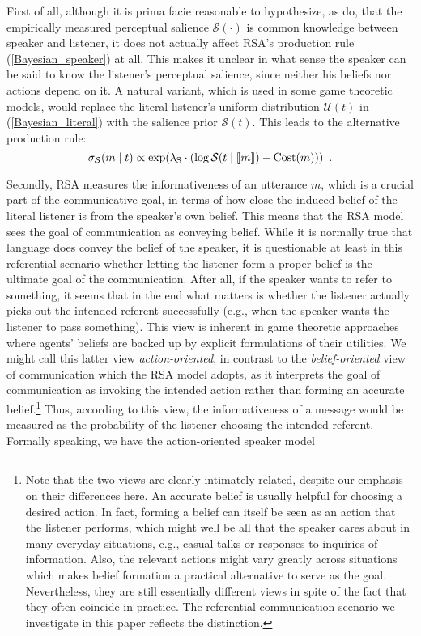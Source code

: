 First of all, although it is prima facie reasonable to hypothesize, as
\cite{Frank} do, that the empirically measured perceptual salience
$\mathcal{S}(\cdot)$ is common knowledge between speaker and listener,
it does not actually affect RSA's production rule
(\ref{Bayesian_speaker}) at all. This makes it unclear in what sense
the speaker can be said to know the listener's perceptual salience,
since neither his beliefs nor actions depend on it. A natural variant,
which is used in some game theoretic models, would replace the literal
listener's uniform distribution $\mathcal{U}(t)$ in
(\ref{Bayesian_literal}) with the salience prior
$\mathcal{S}(t)$. This leads to the alternative production rule:
\begin{equation} \label{Bayesian_speaker_salience}
\sigma_\mathcal{S}(m \mid t) \propto \exp(\lambda_\mathrm{S} \cdot (\log \mathcal{S}(t\mid \llbracket m \rrbracket)-\mbox{Cost}(m))) \enspace .
\end{equation}


Secondly, RSA measures the informativeness of an utterance $m$, which
is a crucial part of the communicative goal, in terms of how close the
induced belief of the literal listener is from the speaker's own
belief. This means that the RSA model sees the goal of communication
as conveying belief. While it is normally true that language does
convey the belief of the speaker, it is questionable at least in this
referential scenario whether letting the listener form a proper belief
is the ultimate goal of the communication. After all, if the speaker
wants to refer to something, it seems that in the end what matters is
whether the listener actually picks out the intended referent
successfully (e.g., when the speaker wants the listener to pass
something). This view is inherent in game theoretic approaches where
agents' beliefs are backed up by explicit formulations of their
utilities. We might call this latter view \emph{action-oriented}, in
contrast to the \emph{belief-oriented} view of communication which the
RSA model adopts, as it interprets the goal of communication as
invoking the intended action rather than forming an accurate
belief.\footnote{Note that the two views are clearly intimately
  related, despite our emphasis on their differences here. An accurate
  belief is usually helpful for choosing a desired action. In fact,
  forming a belief can itself be seen as an action that the listener
  performs, which might well be all that the speaker cares about in
  many everyday situations, e.g., casual talks or responses to
  inquiries of information. Also, the relevant actions might vary
  greatly across situations which makes belief formation a practical
  alternative to serve as the goal. Nevertheless, they are still
  essentially different views in spite of the fact that they often
  coincide in practice. The referential communication scenario we
  investigate in this paper reflects the distinction.} Thus, according
to this view, the informativeness of a message would be measured as
the probability of the listener choosing the intended
referent. Formally speaking, we have the action-oriented speaker model
  
